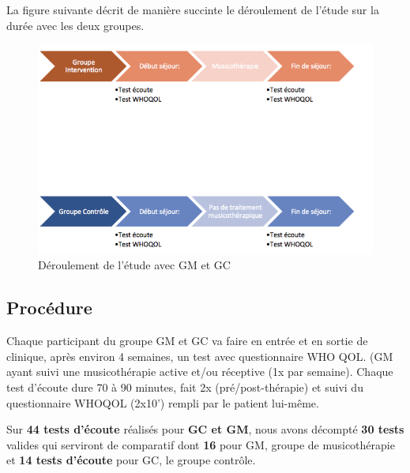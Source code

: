 La figure suivante décrit de manière succinte le déroulement de
l'étude sur la durée avec les deux groupes.



        \begin{figure}[hb]
\centering
\includegraphics[width=1\linewidth]{images/Groupecontrole.png}
\caption[Schéma du déroulement]{Déroulement de l'étude avec GM et GC}

\end{figure}

 \subsection{Procédure}
Chaque participant du groupe GM et GC va faire en entrée et en sortie de
clinique, après environ 4 semaines, un
          test avec questionnaire  WHO QOL. (GM ayant suivi une musicothérapie active et/ou réceptive (1x par
        semaine).
          Chaque test d'écoute dure
        70 à 90 minutes, fait 2x (pré/post-thérapie) et
        suivi du questionnaire WHOQOL (2x10') rempli par le
        patient lui-même.

Sur \textbf{44 tests d'écoute} réalisés pour \textbf{GC et GM},
      nous avons décompté\textbf{ 30 tests} valides qui serviront de
     comparatif dont \textbf{16} pour
     GM, groupe de musicothérapie et \textbf{14 tests d'écoute} pour GC, le groupe
     contrôle.

